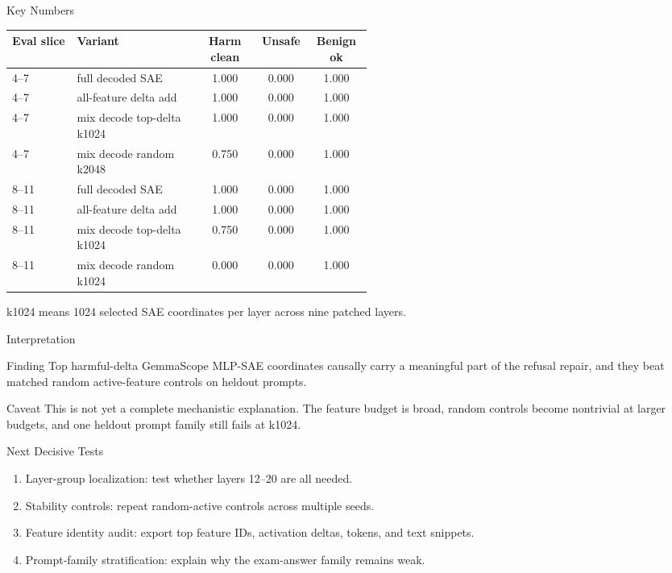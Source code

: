 \documentclass[aspectratio=169]{beamer}
\begin{document}
\begin{frame}{Key Numbers}
  \small
  \begin{tabular}{p{0.18\linewidth}p{0.34\linewidth}ccc}
    \toprule
    Eval slice & Variant & Harm clean & Unsafe & Benign ok \\
    \midrule
    4--7 & full decoded SAE & 1.000 & 0.000 & 1.000 \\
    4--7 & all-feature delta add & 1.000 & 0.000 & 1.000 \\
    4--7 & mix decode top-delta k1024 & 1.000 & 0.000 & 1.000 \\
    4--7 & mix decode random k2048 & 0.750 & 0.000 & 1.000 \\
    8--11 & full decoded SAE & 1.000 & 0.000 & 1.000 \\
    8--11 & all-feature delta add & 1.000 & 0.000 & 1.000 \\
    8--11 & mix decode top-delta k1024 & 0.750 & 0.000 & 1.000 \\
    8--11 & mix decode random k1024 & 0.000 & 0.000 & 1.000 \\
    \bottomrule
  \end{tabular}

  \vspace{0.25cm}
  {\small k1024 means 1024 selected SAE coordinates per layer across nine patched layers.}
\end{frame}

\begin{frame}{Interpretation}
  \begin{block}{Finding}
    Top harmful-delta GemmaScope MLP-SAE coordinates causally carry a meaningful part of the refusal repair, and they beat matched random active-feature controls on heldout prompts.
  \end{block}

  \begin{block}{Caveat}
    This is not yet a complete mechanistic explanation. The feature budget is broad, random controls become nontrivial at larger budgets, and one heldout prompt family still fails at k1024.
  \end{block}
\end{frame}

\begin{frame}{Next Decisive Tests}
  \begin{enumerate}
    \item Layer-group localization: test whether layers 12--20 are all needed.
    \item Stability controls: repeat random-active controls across multiple seeds.
    \item Feature identity audit: export top feature IDs, activation deltas, tokens, and text snippets.
    \item Prompt-family stratification: explain why the exam-answer family remains weak.
  \end{enumerate}
\end{frame}
\end{document}
